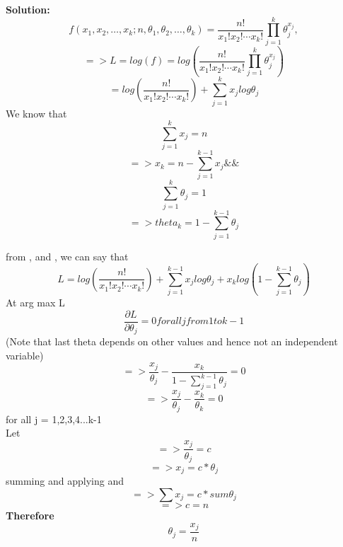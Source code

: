 \documentclass[twoside,10pt]{article}
\begin{document}
\textbf{Solution:}
$$f(x_1,x_2,\dots,x_k;n,\theta_1,\theta_2,\dots,\theta_k)=\frac{n!}{x_1!x_2!\cdots x_k!}\prod_{j=1}^{k}\theta_j^{x_j},$$
\begin{equation} \nonumber
=> L = log(f) = log(\frac{n!}{x_1!x_2!\cdots x_k!}\prod_{j=1}^{k}\theta_j^{x_j})
\end{equation}
\begin{equation} \label{2b1}
= log(\frac{n!}{x_1!x_2!\cdots x_k!}) + \sum_{j=1}^{k}{x_j}log{\theta_j}
\end{equation}
We know that 
\begin{equation} \nonumber
\sum_{j=1}^{k}{x_j} = n 
\end{equation}
\begin{equation} \label{xsum}
=> x_k = n - \sum_{j=1}^{k-1}{x_j}\&\&
\end{equation}
\begin{equation} \nonumber
\sum_{j=1}^{k}{\theta_j} = 1 
\end{equation}
\begin{equation} \label{tsum}
=> theta_k = 1 - \sum_{j=1}^{k-1}{\theta_j}
\end{equation}

from \label{2b1}, \label{xsum} and \label{tsum}, we can say that 
\begin{equation} \nonumber
L = log(\frac{n!}{x_1!x_2!\cdots x_k!}) + \sum_{j=1}^{k-1}{x_j}log{\theta_j}
+ {x_k}log(1-\sum_{j=1}^{k-1}{\theta_j})
\end{equation}
At arg max L
\begin{equation} \nonumber
\frac{\partial L}{\partial \theta_j} = 0 for all j from 1 to k-1
\end{equation}
(Note that last theta depends on other values and hence not an independent variable)
\begin{equation} \nonumber
=> \frac{x_j}{\theta_j}
-\frac{x_k}{1-\sum_{j=1}^{k-1}{\theta_j}} = 0
\end{equation}
\begin{equation} \nonumber
=> \frac{x_j}{\theta_j}
-\frac{x_k}{\theta_k} = 0 
\end{equation}
for all j = 1,2,3,4...k-1\\
Let
\begin{equation} \nonumber
=> \frac{x_j}{\theta_j} = c
\end{equation}
\begin{equation} \nonumber
=> x_j = c*{\theta_j}
\end{equation}
summing and applying \label{xsum} and \label{tsum}
\begin{equation} \nonumber
=> \sum{x_j} = c*{sum{\theta_j}}
\end{equation}
\begin{equation} \nonumber
=> c = n
\end{equation}
\textbf{Therefore}
\begin{equation} \nonumber
\theta_j = \frac{x_j}{n}
\end{equation}
\end{document}

